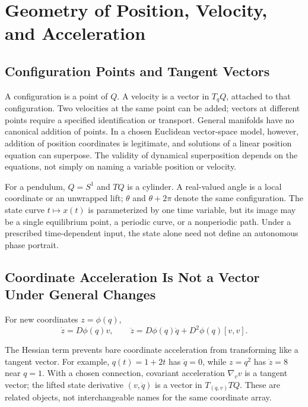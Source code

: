 \section{Geometry of Position, Velocity, and Acceleration}
\label{sec:state_geometry}

\subsection{Configuration Points and Tangent Vectors}

A configuration is a point of $Q$. A velocity is a vector in $T_qQ$, attached to that configuration. Two velocities at the same point can be added; vectors at different points require a specified identification or transport. General manifolds have no canonical addition of points. In a chosen Euclidean vector-space model, however, addition of position coordinates is legitimate, and solutions of a linear position equation can superpose. The validity of dynamical superposition depends on the equations, not simply on naming a variable position or velocity.

For a pendulum, $Q=S^1$ and $TQ$ is a cylinder. A real-valued angle is a local coordinate or an unwrapped lift; $\theta$ and $\theta+2\pi$ denote the same configuration. The state curve $t\mapsto x(t)$ is parameterized by one time variable, but its image may be a single equilibrium point, a periodic curve, or a nonperiodic path. Under a prescribed time-dependent input, the state alone need not define an autonomous phase portrait.

\subsection{Coordinate Acceleration Is Not a Vector Under General Changes}

For new coordinates $z=\phi(q)$,
\begin{equation}
\label{eq:state_coordinate_acceleration}
 \dot z=D\phi(q)v,\qquad
 \ddot z=D\phi(q)\ddot q+D^2\phi(q)[v,v].
\end{equation}

The Hessian term prevents bare coordinate acceleration from transforming like a tangent vector. For example, $q(t)=1+2t$ has $\ddot q=0$, while $z=q^2$ has $\ddot z=8$ near $q=1$. With a chosen connection, covariant acceleration $\nabla_vv$ is a tangent vector; the lifted state derivative $(v,\ddot q)$ is a vector in $T_{(q,v)}TQ$. These are related objects, not interchangeable names for the same coordinate array.

